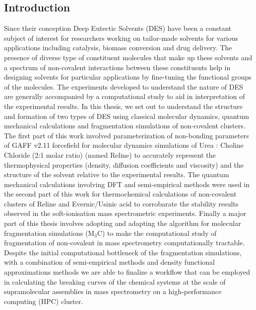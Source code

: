 \subsection*{Introduction}
\label{sec:summary}
Since their conception Deep Eutectic Solvents (DES) have been a constant subject of interest for researchers working on tailor-made solvents for various applications including catalysis, biomass conversion and drug delivery.
The presence of diverse type of constituent molecules that make up these solvents and a spectrum of non-covalent interactions between these constituents help in designing solvents for particular applications by fine-tuning the functional groups of the molecules.
The experiments developed to understand the nature of DES are generally accompanied by a computational study to aid in interpretation of the experimental results.
In this thesis, we set out to understand the structure and formation of two types of DES using classical molecular dynamics, quantum mechanical calculations and fragmentation simulations of non-covalent clusters.
The first part of this work involved parameterization of non-bonding parameters of GAFF v2.11 forcefield for molecular dynamics simulations of Urea : Choline Chloride (2:1 molar ratio) (named Reline) to accurately represent the thermophysical properties (density, diffusion coefficients and viscosity) and the structure of the solvent relative to the experimental results. 
The quantum mechanical calculations involving DFT and semi-empirical methods were used in the second part of this work for thermochemical calculations of non-covalent clusters of Reline and Evernic/Usinic acid to corrobarate the stability results observed in the soft-ionisation mass spectrometric experiments.
Finally a major part of this thesis involves adopting and adapting the algorithm for molecular fragmentation simulations (M$_{3}$C) to make the computational study of fragmentation of non-covalent in mass spectrometry computationally tractable. Despite the initial computational bottleneck of the fragmentation simulations, with a combination of semi-empirical methods and density functional approximations methods we are able to finalize a workflow that can be employed in calculating the breaking curves of the chemical systems at the scale of supramolecular assemblies in mass spectrometry on a high-performance computing (HPC) cluster.
